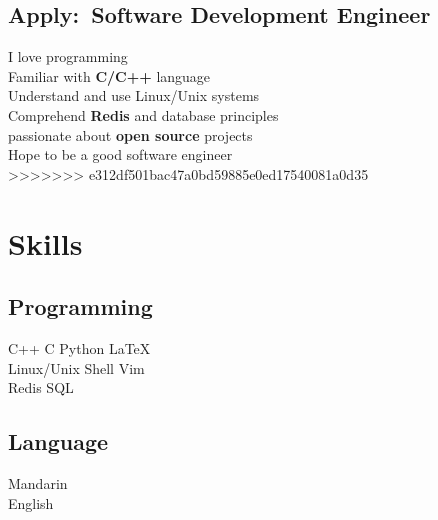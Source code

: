 \documentclass[]{deedy-resume-openfont}
\begin{document}
\begin{minipage}[t]{0.25\textwidth}
\subsection{Apply:\  Software Development Engineer}
I love programming \\
Familiar with \textbf{C/C++} language \\
Understand and use Linux/Unix systems \\
Comprehend \textbf{Redis} and database principles \\
passionate about \textbf{open source} projects \\
Hope to be a good software engineer \\
>>>>>>> e312df501bac47a0bd59885e0ed17540081a0d35
\sectionsep


\section{Skills}
\sectionsep
\subsection{Programming}
C++ \textbullet{} C \textbullet{} Python \textbullet{} \LaTeX \\
Linux/Unix \textbullet{} Shell \textbullet{} Vim \\
Redis \textbullet{} SQL \\ 
\sectionsep

\subsection{Language}
Mandarin \\
English \\

%
%

\end{minipage} 
\hfill
\end{document}
